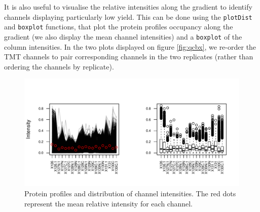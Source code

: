 It is also useful to visualise the relative intensities along the
gradient to identify channels displaying particularly low yield. This
can be done using the \texttt{plotDist} and \texttt{boxplot}
functions, that plot the protein profiles occupancy along the gradient
(we also display the mean channel intensities) and a \texttt{boxplot}
of the column intensities.  In the two plots displayed on figure
\ref{fig:qcbx}, we re-order the TMT channels to pair corresponding
channels in the two replicates (rather than ordering the channels by
replicate).

\begin{figure}[!ht]
  \centering
\begin{knitrout}
\color{fgcolor}\begin{kframe}
\begin{alltt}
\hlstd{(} \hlstd{=} \hlstd{(}\hlstd{,} \hlstd{),} 
     \hlstd{=} \hlstd{,}         
     \hlstd{=} \hlstd{)}   
 \hlkwb{<-} \hlopt{$}
  \hlstd{=} \hlstd{,}  \hlstd{=} \hlstd{)}
\hlstd{(}\hlstd{(}  \hlstd{=} \hlstd{,}  \hlstd{=} \hlstd{)}
\hlstd{(}
\end{alltt}
\end{kframe}
\includegraphics[width=\textwidth]{figure/qcbx-1} 

\end{knitrout}
\caption{Protein profiles and distribution of channel intensities. The
  red dots represent the mean relative intensity for each channel. }
  \label{fig:q  cbx}
\end{figure}

